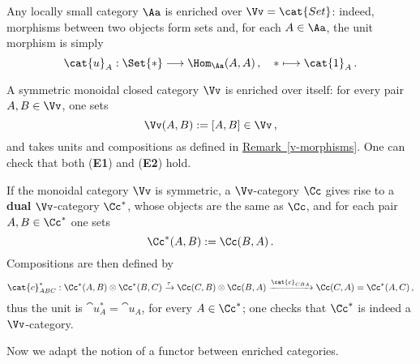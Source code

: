 \begin{ex}
    Any locally small category $\Aa$ is enriched over $\Vv=\cat{Set}$:
    indeed, morphisms between two objects form sets and, for each $A \in \Aa$,
    the unit morphism is simply
    \begin{equation*}
        \cat{u}_{A}: \Set{\ast} \longrightarrow \Hom_{\Aa}(A,A)\,,
        \quad \ast \longmapsto \cat{1}_{A}\,.
    \end{equation*}
\end{ex}

\begin{ex!}\label{smcc-enriched}
    A symmetric monoidal closed category $\Vv$ is enriched over itself:
    for every pair $A,B \in \Vv$, one sets
    \begin{equation*}
        \Vv(A,B) := [A,B] \in \Vv\,,
    \end{equation*}
    and takes units and compositions as defined in 
    \hyperref[v-morphisms]{Remark~\ref*{v-morphisms}}.
    One can check that both (\textbf{E1}) and (\textbf{E2}) hold.
\end{ex!}

\begin{ex}
    If the monoidal category $\Vv$ is symmetric,
    a $\Vv$-category $\Cc$ gives rise to a 
    \textbf{dual} $\Vv$-category $\Cc^{*}$,
    whose objects are the same as $\Cc$,
    and for each pair $A,B \in \Cc^{*}$
    one sets
    \begin{equation*}
        \Cc^*(A,B) := \Cc(B,A)\,.
    \end{equation*}
    Compositions are then defined by
    \begin{equation*}
        \cat{c}^*_{ABC} : \Cc^*(A,B) \otimes \Cc^*(B,C)
        \xrightarrow[]{\tau} \Cc(C,B) \otimes \Cc(B,A)
        \xrightarrow[]{\cat{c}_{CBA}} \Cc(C,A) = \Cc^*(A,C)\,,
    \end{equation*}
    thus the unit is $\cat{u}_{A}^* = \cat{u}_{A}$, for every $A \in \Cc^*$;
    one checks that $\Cc^*$ is indeed a $\Vv$-category.
    
\end{ex}

Now we adapt the notion of a functor between enriched categories.

